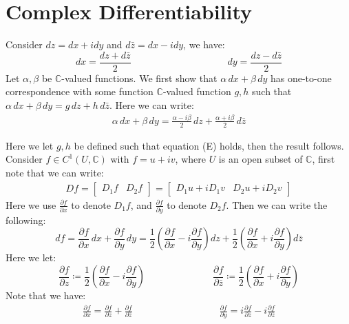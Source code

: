 \documentclass[15pt]{book}
\theoremstyle{break}
\theoremstyle{break}
\newcommand{\Complex}{\mathbb{C}}
\newcommand{\pd}{\partial}
\newcommand{\bmat}[1]{\begin{bmatrix} #1 \end{bmatrix}}
\begin{document}
\newpage
\section[Complex Differentiability]{\color{red}Complex Differentiability\color{black}}

Consider $dz = dx+idy$ and $d\bar{z} = dx-idy$, we have: 
$$dx = \frac{dz+d\bar{z}}{2}\qquad\qquad\qquad\qquad\qquad dy = \frac{dz - d\bar{z}}{2}$$ 
Let $\alpha,\beta$ be $\Complex$-valued functions. We first show that $\alpha\, dx + \beta\, dy $ has one-to-one correspondence with some function $\Complex$-valued function $g,h$ such that $\alpha\, dx + \beta\, dy = g\, dz + h\, d\bar{z}$. Here we can write:
\begin{align*}
\alpha\, dx + \beta\, dy = \frac{\alpha-i\beta}{2} \, dz + \frac{\alpha + i\beta}{2}\, d\bar{z} \tag{E}
\end{align*}

Here we let $g,h$ be defined such that equation (E) holds, then the result follows.\\

Consider $f \in C^1(U, \Complex)$ with $f= u+iv$, where $U$ is an open subset of $\Complex$, first note that we can write:
\begin{align*}
Df = \bmat{D_1f & D_2f} = \bmat{D_1u + iD_1v & D_2u+iD_2v}
\end{align*}
Here we use $\frac{\partial f}{\partial x}$ to denote $D_1f$, and $\frac{\partial f}{\partial y}$ to denote $D_2f$. Then we can write the following:
$$df = \frac{\partial f}{\partial x}\, dx +\frac{\partial f}{\partial y}\, dy = \frac{1}{2}\left( \frac{\partial f}{\partial x}-i \frac{\partial f}{\partial y}\right) dz + \frac{1}{2}\left( \frac{\partial f}{\partial x}+i \frac{\partial f}{\partial y}\right) d\bar{z}$$
Here we let:
$$\frac{\partial f}{\partial z}\coloneqq \frac{1}{2}\left( \frac{\partial f}{\partial x}-i \frac{\partial f}{\partial y}\right)\qquad\qquad\qquad\quad\frac{\partial f}{\partial \bar{z}}\coloneqq \frac{1}{2}\left( \frac{\partial f}{\partial x}+i \frac{\partial f}{\partial y}\right)$$ Note that we have:
\begin{align*}
\frac{\partial f}{\partial x} = \frac{\pd f}{\pd z}+ \frac{\pd f}{\pd \bar{z}}\qquad\qquad\qquad\qquad\quad
\frac{\pd f}{\pd y}= i \frac{\pd f}{\pd z} - i \frac{\pd f}{\pd \bar{z}}
\end{align*}
\end{document}
